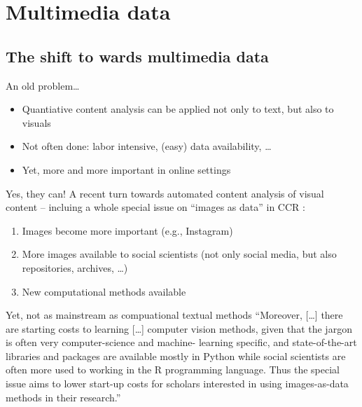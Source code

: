 \section{Multimedia data}


\subsection{The shift to wards multimedia data}

\begin{frame}{An old problem\ldots}
  \begin{itemize}
  \item Quantiative content analysis can be applied not only to text, but also to visuals \parencite[e.g.,][]{Bock2011}
  \item Not often done: labor intensive, (easy) data availability, \ldots
  \item Yet, more and more important in online settings \parencite[e.g.,][]{Araujo2020b}
  \end{itemize}
\end{frame}



\begin{frame}{Yes, they can! }
  A recent turn towards automated content analysis of visual content -- incluing a whole special issue on ``images as data'' in CCR \parencite{Casas2022}:
 
  \begin{enumerate}
  \item Images become more important (e.g., Instagram)
  \item More images available to social scientists (not only social media, but also repositories, archives, \ldots)
  \item New computational methods available
  \end{enumerate}
\end{frame}



\begin{frame}{Yet, not as mainstream as compuational textual methods}
``Moreover, [\ldots] there are
starting costs to learning [\ldots]  computer vision
methods, given that the jargon is often very computer-science and machine-
learning specific, and state-of-the-art libraries and packages are available
mostly in Python while social scientists are often more used to working
in the R programming language. Thus
the special issue aims to lower
start-up costs for scholars interested in using images-as-data methods in
their research.''
\parencite[p.~3]{Casas2022}
\end{frame}

